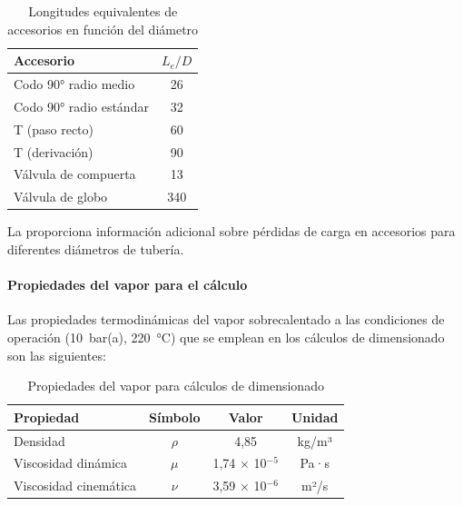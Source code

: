 \begin{table}[H]
	\centering
	\caption{Longitudes equivalentes de accesorios en función del diámetro}
	\label{tab:longitudes-equivalentes}
	\begin{tabular}{lc}
		\toprule
		\textbf{Accesorio}      & \textbf{$L_e/D$} \\
		\midrule
		Codo 90° radio medio    & 26               \\
		Codo 90° radio estándar & 32               \\
		T (paso recto)          & 60               \\
		T (derivación)          & 90               \\
		Válvula de compuerta    & 13               \\
		Válvula de globo        & 340              \\
		\bottomrule
	\end{tabular}
\end{table}

La  proporciona información adicional sobre pérdidas de carga en accesorios para diferentes diámetros de tubería.

\paragraph{Propiedades del vapor para el cálculo}

Las propiedades termodinámicas del vapor sobrecalentado a las condiciones de operación (10~bar(a), 220~°C) que se emplean en los cálculos de dimensionado son las siguientes:

\begin{table}[H]
	\centering
	\caption{Propiedades del vapor para cálculos de dimensionado}
	\label{tab:propiedades-vapor-dimensionado}
	\begin{tabular}{lccc}
		\toprule
		\textbf{Propiedad}    & \textbf{Símbolo} & \textbf{Valor}          & \textbf{Unidad} \\
		\midrule
		Densidad              & $\rho$           & 4,85                    & kg/m³           \\
		Viscosidad dinámica   & $\mu$            & 1,74 $\times$ 10$^{-5}$ & Pa·s            \\
		Viscosidad cinemática & $\nu$            & 3,59 $\times$ 10$^{-6}$ & m²/s            \\
		\bottomrule
	\end{tabular}
\end{table}

